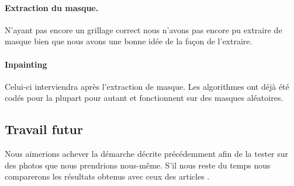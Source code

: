 \documentclass[10pt,a4paper]{article}
\begin{document}
\paragraph{Extraction du masque. } N'ayant pas encore un grillage correct nous n'avons pas encore pu extraire de masque bien que nous avons une bonne idée de la façon de l'extraire.

\paragraph{Inpainting} Celui-ci interviendra après l'extraction de masque. Les algorithmes ont déjà été codés pour la plupart pour autant et fonctionnent sur des masques aléatoires.

\subsection{Travail futur}
Nous aimerions achever la démarche décrite précédemment afin de la tester sur des photos que nous prendrions nous-même. S'il nous reste du temps nous comparerons les résultats obtenus avec ceux des articles \cite{YLiu2008}.



\end{document}
